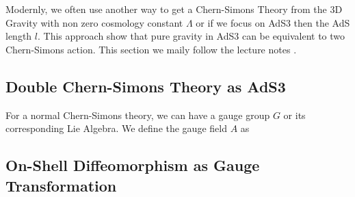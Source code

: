 Modernly, we often use another way to get a Chern-Simons Theory from
the 3D Gravity with non zero cosmology constant $ \Lambda $ or if we
focus on AdS3 then the AdS length $ l $. This approach show that pure
gravity in AdS3 can be equivalent to two Chern-Simons action. This
section we maily follow the lecture notes
\cite{compereAdvancedLecturesGeneral2019a}.

\subsection{Double Chern-Simons Theory as AdS3}

For a normal Chern-Simons theory, we can have a gauge group $ G $ or
its corresponding Lie Algebra. We define the gauge field $ A $ as

\subsection{On-Shell Diffeomorphism as Gauge Transformation}
